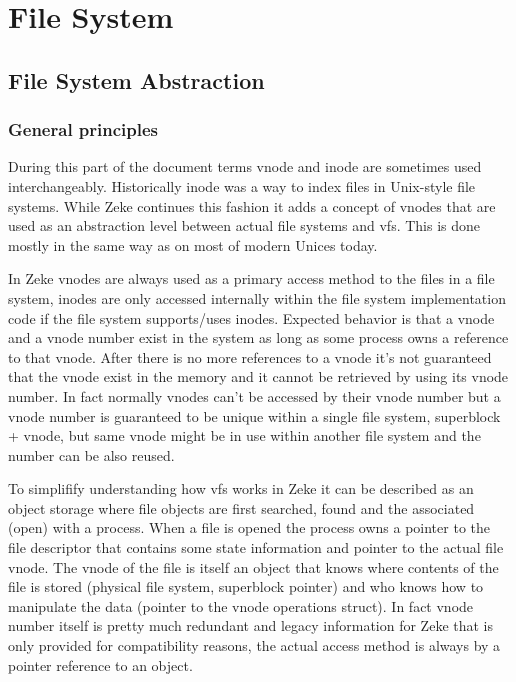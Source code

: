 \part{File System}

\chapter{File System Abstraction}

\section{General principles}

During this part of the document terms \acs{vnode} and \acs{inode} are
sometimes used interchangeably. Historically inode was a way to index files
in Unix-style file systems.\cite{Wikipedia:inode} While Zeke continues this
fashion it adds a concept of vnodes that are used as an abstraction level
between actual file systems and \acf{vfs}. This is done mostly in the same way
as on most of modern Unices today.

In Zeke vnodes are always used as a primary access method to the files in
a file system, inodes are only accessed internally within the file system
implementation code if the file system supports/uses inodes. Expected behavior
is that a vnode and a vnode number exist in the system as long as some process
owns a reference to that vnode. After there is no more references to a vnode
it's not guaranteed that the vnode exist in the memory and it cannot be
retrieved by using its vnode number. In fact normally vnodes can't be accessed
by their vnode number but a vnode number is guaranteed to be unique within
a single file system, superblock + vnode, but same vnode might be in use within
another file system and the number can be also reused.

To simplifify understanding how \acs{vfs} works in Zeke it can be described as
an object storage where file objects are first searched, found and the
associated (open) with a process. When a file is opened the process owns a
pointer to the file descriptor that contains some state information and pointer
to the actual file vnode. The vnode of the file is itself an object that knows
where contents of the file is stored (physical file system, superblock pointer)
and who knows how to manipulate the data (pointer to the vnode operations struct).
In fact vnode number itself is pretty much redundant and legacy information for
Zeke that is only provided for compatibility reasons, the actual access method
is always by a pointer reference to an object.

